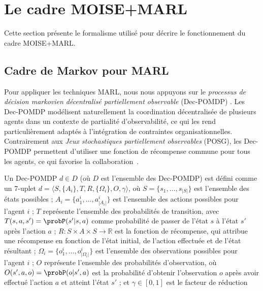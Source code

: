 \section{Le cadre MOISE+MARL}
\label{sec:moise_marl_framework}

Cette section présente le formalisme utilisé pour décrire le fonctionnement du cadre MOISE+MARL.

\subsection{Cadre de Markov pour MARL}

Pour appliquer les techniques MARL, nous nous appuyons sur le \textit{processus de décision markovien décentralisé partiellement observable} (Dec-POMDP) \cite{Oliehoek2016}. Les Dec-POMDP modélisent naturellement la coordination décentralisée de plusieurs agents dans un contexte de partialité d'observabilité, ce qui les rend particulièrement adaptés à l'intégration de contraintes organisationnelles. Contrairement aux \textit{Jeux stochastiques partiellement observables} (POSG), les Dec-POMDP permettent d'utiliser une fonction de récompense commune pour tous les agents, ce qui favorise la collaboration~\cite{Beynier2013}.

Un Dec-POMDP $d \in D$ (où $D$ est l'ensemble des Dec-POMDP) est défini comme un 7-uplet $d = \langle S, \{A_i\}, T, R, \{\Omega_i\}, O, \gamma \rangle$, où $S = \{s_1,\dots,s_{|S|}\}$ est l'ensemble des états possibles ; $A_{i} = \{a_{1}^{i},\dots,a_{|A_{i}|}^{i}\}$ est l'ensemble des actions possibles pour l'agent $i$ ; $T$ représente l'ensemble des probabilités de transition, avec $T(s,a,s') = \probP(s'|s,a)$ comme probabilité de passer de l'état $s$ à l'état $s'$ après l'action $a$ ; $R: S \times A \times S \rightarrow \mathbb{R}$ est la fonction de récompense, qui attribue une récompense en fonction de l'état initial, de l'action effectuée et de l'état résultant ; $\Omega_{i} = \{o_{1}^{i},\dots,o_{|\Omega_{i}|}^{i}\}$ est l'ensemble des observations possibles pour l'agent $i$ ; $O$ représente l'ensemble des probabilités d'observation, où $O(s',a,o) = \probP(o|s',a)$ est la probabilité d'obtenir l'observation $o$ après avoir effectué l'action $a$ et atteint l'état $s'$ ; et $\gamma \in [0,1]$ est le facteur de réduction

